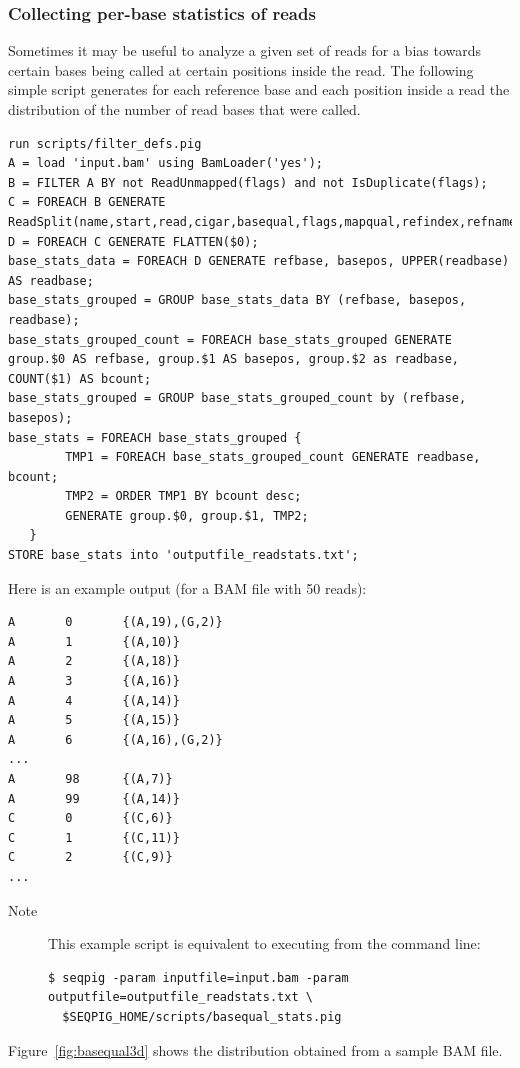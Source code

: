 \subsubsection{Collecting per-base statistics of reads}
Sometimes it may be useful to analyze a given set of reads for a bias
towards certain bases being called at certain positions inside the
read. The following simple script generates for each reference base and
each position inside a read the distribution of the number of read bases
that were called.
\begin{lstlisting}
run scripts/filter_defs.pig
A = load 'input.bam' using BamLoader('yes');
B = FILTER A BY not ReadUnmapped(flags) and not IsDuplicate(flags);
C = FOREACH B GENERATE ReadSplit(name,start,read,cigar,basequal,flags,mapqual,refindex,refname,attributes#'MD');
D = FOREACH C GENERATE FLATTEN($0);
base_stats_data = FOREACH D GENERATE refbase, basepos, UPPER(readbase) AS readbase;
base_stats_grouped = GROUP base_stats_data BY (refbase, basepos, readbase);
base_stats_grouped_count = FOREACH base_stats_grouped GENERATE group.$0 AS refbase, group.$1 AS basepos, group.$2 as readbase, COUNT($1) AS bcount;
base_stats_grouped = GROUP base_stats_grouped_count by (refbase, basepos);
base_stats = FOREACH base_stats_grouped {
        TMP1 = FOREACH base_stats_grouped_count GENERATE readbase, bcount;
        TMP2 = ORDER TMP1 BY bcount desc;
        GENERATE group.$0, group.$1, TMP2;
   }
STORE base_stats into 'outputfile_readstats.txt';
\end{lstlisting}
Here is an example output (for a BAM file with 50 reads):
\begin{lstlisting}
A       0       {(A,19),(G,2)}
A       1       {(A,10)}
A       2       {(A,18)}
A       3       {(A,16)}
A       4       {(A,14)}
A       5       {(A,15)}
A       6       {(A,16),(G,2)}
...
A       98      {(A,7)}
A       99      {(A,14)}
C       0       {(C,6)}
C       1       {(C,11)}
C       2       {(C,9)}
...
\end{lstlisting}
\begin{description}
	\item[Note] This example script is equivalent to executing from the command line:
\begin{lstlisting}
$ seqpig -param inputfile=input.bam -param outputfile=outputfile_readstats.txt \
  $SEQPIG_HOME/scripts/basequal_stats.pig
\end{lstlisting}
\end{description}
Figure~\ref{fig:basequal3d} shows the distribution obtained from a sample BAM file.

